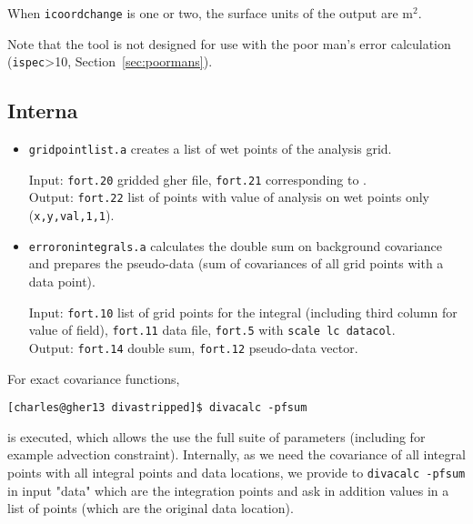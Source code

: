When {\tt icoordchange} is one or two, the surface units of the output are m$^2$.

Note that the tool is not designed for use with the poor man's error calculation (\texttt{ispec}>10, Section~\ref{sec:poormans}).

\subsection{Interna}

\begin{itemize}

\item \texttt{gridpointlist.a} creates a list of wet points of the analysis grid. 

Input: \texttt{fort.20} gridded gher file, \texttt{fort.21} corresponding to .\\ 
Output: \texttt{fort.22} list of points with value of analysis on wet points only (\texttt{x,y,val,1,1}).

\item \texttt{erroronintegrals.a} calculates the double sum on background covariance and prepares the pseudo-data (sum of covariances of all grid points with a  data point).

Input: \texttt{fort.10} list of grid points for the integral (including third column for value of field), \texttt{fort.11} data file, \texttt{fort.5} with \texttt{scale lc datacol}.\\
Output: \texttt{fort.14} double sum, \texttt{fort.12} pseudo-data vector.
\end{itemize}

For exact covariance functions, 

\begin{lstlisting}[style=Bash]
[charles@gher13 divastripped]$ divacalc -pfsum
\end{lstlisting}

is executed, which allows the use the full suite of \diva parameters (including for example advection constraint). Internally, as we need the covariance of all integral points with all integral points and data locations, we provide to {\tt divacalc -pfsum} in input "data" which are the integration points and ask in addition values in a list of points (which are the original data location).

